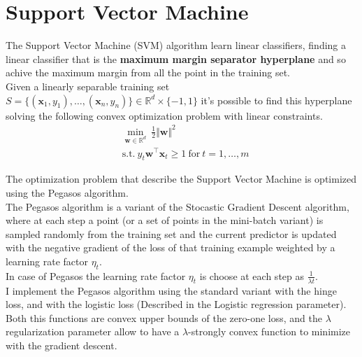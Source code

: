 \newpage
\section{Support Vector Machine}
The Support Vector Machine (SVM) algorithm learn linear classifiers, finding a linear classifier that is the \textbf{maximum margin separator hyperplane} and so achive the maximum margin from all the point in the training set.\\

Given a linearly separable training set $S = \{(\boldsymbol{x}_1, y_1), \dots, (\boldsymbol{x}_n, y_n)\} \in \mathbb{R}^d \times \{-1, 1\}$ it's possible to find this hyperplane solving the following convex optimization problem with linear constraints.\\ 
\begin{align*} 
    & \underset{\boldsymbol{w} \in \mathbb{R}^d}{\min} \ \frac{1}{2} \Vert \boldsymbol{w} \Vert^2 \\
    & \text{s.t.} \ y_t \boldsymbol{w}^\top \boldsymbol{x}_t \geq 1 \ \text{for} \ t = 1, \dots, m 
\end{align*}

The optimization problem that describe the Support Vector Machine is optimized using the Pegasos algorithm.\\
The Pegasos algorithm is a variant of the Stocastic Gradient Descent algorithm, where at each step a point (or a set of points in the mini-batch variant) is sampled randomly from the training set
and the current predictor is updated with the negative gradient of the loss of that training example weighted by a learning rate factor $\eta_t$.\\
In case of Pegasos the learning rate factor $\eta_t$ is choose at each step as $\frac{1}{\lambda t}$.\\
I implement the Pegasos algorithm using the standard variant with the hinge loss, and with the logistic loss (Described in the Logistic regression parameter).\\
Both this functions are convex upper bounds of the zero-one loss, and the $\lambda$ regularization parameter allow to have a $\lambda$-strongly convex function to minimize with the gradient descent.\\
